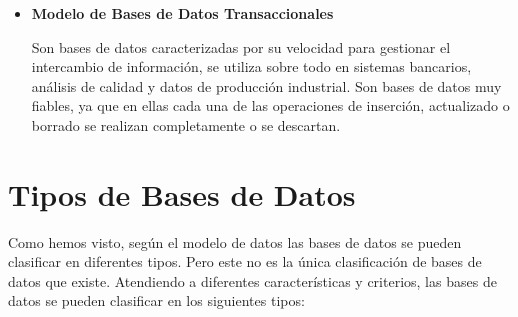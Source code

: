 \begin{itemize}
    \item \textbf{Modelo de Bases de Datos Transaccionales}

    Son bases de datos caracterizadas por su velocidad para gestionar el intercambio de información, se utiliza sobre todo en sistemas bancarios, análisis de calidad y datos de producción industrial. Son bases de datos muy fiables, ya que en ellas cada una de las operaciones de inserción, actualizado o borrado se realizan completamente o se descartan.
\end{itemize}

\section{Tipos de Bases de Datos}
Como hemos visto, según el modelo de datos las bases de datos se pueden clasificar en diferentes tipos. Pero este no es la única clasificación de bases de datos que existe. Atendiendo a diferentes características y criterios, las bases de datos se pueden clasificar en los siguientes tipos:


